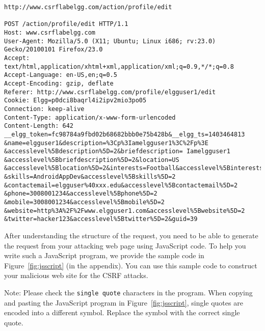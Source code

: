{\footnotesize
\begin{Verbatim}[frame=single]
 http://www.csrflabelgg.com/action/profile/edit

POST /action/profile/edit HTTP/1.1
Host: www.csrflabelgg.com
User-Agent: Mozilla/5.0 (X11; Ubuntu; Linux i686; rv:23.0) Gecko/20100101 Firefox/23.0
Accept: text/html,application/xhtml+xml,application/xml;q=0.9,*/*;q=0.8
Accept-Language: en-US,en;q=0.5
Accept-Encoding: gzip, deflate
Referer: http://www.csrflabelgg.com/profile/elgguser1/edit
Cookie: Elgg=p0dci8baqrl4i2ipv2mio3po05
Connection: keep-alive
Content-Type: application/x-www-form-urlencoded
Content-Length: 642
__elgg_token=fc98784a9fbd02b68682bbb0e75b428b&__elgg_ts=1403464813
&name=elgguser1&description=%3Cp%3Iamelgguser1%3C%2Fp%3E
&accesslevel%5Bdescription%5D=2&briefdescription= Iamelgguser1
&accesslevel%5Bbriefdescription%5D=2&location=US
&accesslevel%5Blocation%5D=2&interests=Football&accesslevel%5Binterests%5D=2
&skills=AndroidAppDev&accesslevel%5Bskills%5D=2
&contactemail=elgguser%40xxx.edu&accesslevel%5Bcontactemail%5D=2
&phone=3008001234&accesslevel%5Bphone%5D=2
&mobile=3008001234&accesslevel%5Bmobile%5D=2
&website=http%3A%2F%2Fwww.elgguser1.com&accesslevel%5Bwebsite%5D=2
&twitter=hacker123&accesslevel%5Btwitter%5D=2&guid=39
\end{Verbatim}
}

After understanding the structure of the request, you need to 
be able to generate the request from your attacking web page
using JavaScript code. 
To help you write such a JavaScript program,  we provide the
sample code in Figure~\ref{fig:jsscript} (in the appendix). 
You can use this sample code to construct your malicious web site
for the CSRF attacks.


Note: Please check the {\tt single quote} characters in the program. When
copying and pasting the JavaScript program in Figure~\ref{fig:jsscript}, single quotes are encoded
into a different symbol. Replace the symbol with the correct single quote.


